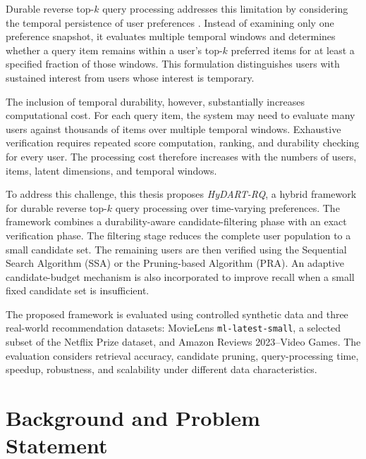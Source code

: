 Durable reverse top-$k$ query processing addresses this limitation by considering the temporal persistence of user preferences \cite{durable_reverse_topk}. Instead of examining only one preference snapshot, it evaluates multiple temporal windows and determines whether a query item remains within a user's top-$k$ preferred items for at least a specified fraction of those windows. This formulation distinguishes users with sustained interest from users whose interest is temporary.

The inclusion of temporal durability, however, substantially increases computational cost. For each query item, the system may need to evaluate many users against thousands of items over multiple temporal windows. Exhaustive verification requires repeated score computation, ranking, and durability checking for every user. The processing cost therefore increases with the numbers of users, items, latent dimensions, and temporal windows.

To address this challenge, this thesis proposes \textit{HyDART-RQ}, a hybrid framework for durable reverse top-$k$ query processing over time-varying preferences. The framework combines a durability-aware candidate-filtering phase with an exact verification phase. The filtering stage reduces the complete user population to a small candidate set. The remaining users are then verified using the Sequential Search Algorithm (SSA) or the Pruning-based Algorithm (PRA). An adaptive candidate-budget mechanism is also incorporated to improve recall when a small fixed candidate set is insufficient.

The proposed framework is evaluated using controlled synthetic data and three real-world recommendation datasets: MovieLens \texttt{ml\allowbreak-latest\allowbreak-small}, a selected subset of the Netflix Prize dataset, and Amazon Reviews 2023--Video Games. The evaluation considers retrieval accuracy, candidate pruning, query-processing time, speedup, robustness, and scalability under different data characteristics.


\section{Background and Problem Statement}
\label{sec:background_problem}


